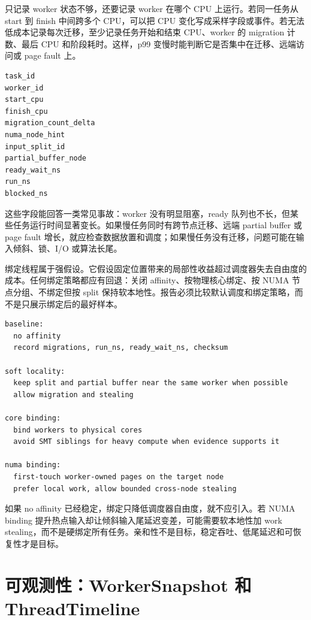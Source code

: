 只记录 worker 状态不够，还要记录 worker 在哪个 CPU 上运行。若同一任务从 start 到 finish 中间跨多个 CPU，可以把 CPU 变化写成采样字段或事件。若无法低成本记录每次迁移，至少记录任务开始和结束 CPU、worker 的 migration 计数、最后 CPU 和阶段耗时。这样，p99 变慢时能判断它是否集中在迁移、远端访问或 page fault 上。

\begin{lstlisting}[numbers=none,caption={迁移相关 trace 字段}]
task_id
worker_id
start_cpu
finish_cpu
migration_count_delta
numa_node_hint
input_split_id
partial_buffer_node
ready_wait_ns
run_ns
blocked_ns
\end{lstlisting}

这些字段能回答一类常见事故：worker 没有明显阻塞，ready 队列也不长，但某些任务运行时间显著变长。如果慢任务同时有跨节点迁移、远端 partial buffer 或 page fault 增长，就应检查数据放置和调度；如果慢任务没有迁移，问题可能在输入倾斜、锁、I/O 或算法长尾。

绑定线程属于强假设。它假设固定位置带来的局部性收益超过调度器失去自由度的成本。任何绑定策略都应有回退：关闭 affinity、按物理核心绑定、按 NUMA 节点分组、不绑定但按 split 保持软本地性。报告必须比较默认调度和绑定策略，而不是只展示绑定后的最好样本。

\begin{lstlisting}[numbers=none,caption={亲和性实验的对照顺序}]
baseline:
  no affinity
  record migrations, run_ns, ready_wait_ns, checksum

soft locality:
  keep split and partial buffer near the same worker when possible
  allow migration and stealing

core binding:
  bind workers to physical cores
  avoid SMT siblings for heavy compute when evidence supports it

numa binding:
  first-touch worker-owned pages on the target node
  prefer local work, allow bounded cross-node stealing
\end{lstlisting}

如果 no affinity 已经稳定，绑定只降低调度器自由度，就不应引入。若 NUMA binding 提升热点输入却让倾斜输入尾延迟变差，可能需要软本地性加 work stealing，而不是硬绑定所有任务。亲和性不是目标，稳定吞吐、低尾延迟和可恢复性才是目标。

\section{可观测性：WorkerSnapshot 和 ThreadTimeline}

